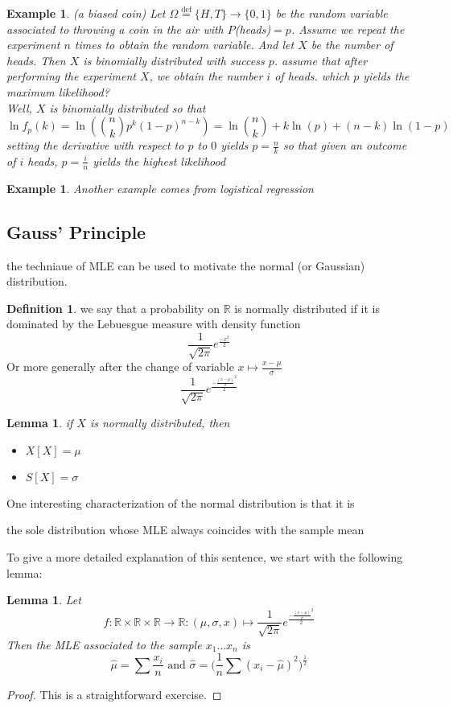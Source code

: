 \documentclass{book}
\theoremstyle{plain}
\newtheorem{example}[corollary]{Example}
\newtheorem{lemma}[corollary]{Lemma}
\theoremstyle{definition}
\newtheorem{definition}[corollary]{Definition}
\renewcommand{\d}[1]{\mathbb{#1}}
\newcommand{\define}{\stackrel{\operatorname{def}}{=}}
\newcommand{\fun}{\mapsto}
\newcommand{\mor}{\longrightarrow}
\begin{document}
\begin{example} (a biased coin)
Let $\Omega\define\{H,T\}\mor\{0,1\}$ be the random variable associated to throwing a coin in the air with $P$(heads)$=p$. Assume we repeat the experiment $n$ times to obtain the random variable. And let $X$ be the number of heads. Then $X$ is binomially distributed with success $p$. assume that after performing the experiment $X$, we obtain the number $i$ of heads. which $p$ yields the maximum likelihood?\\
Well, $X$ is binomially distributed so that
\[
\ln f_p(k)=\ln(\binom{n}{k}p^k(1-p)^{n-k})=\ln\binom{n}{k}+k\ln(p)+(n-k)\ln(1-p) 
\]
setting the derivative with respect to $p$ to $0$ yields $p=\frac{n}{k}$ so that given an outcome of $i$ heads, $p=\frac{i}{n}$ yields the highest likelihood
\end{example}

\begin{example}
Another example comes from logistical regression	
\end{example}

\subsection{Gauss' Principle} the techniaue of MLE can be used to motivate the normal (or Gaussian) distribution.
\begin{definition}
we say that a probability on $\d{R}$ is normally distributed if it is dominated by the Lebuesgue measure with density function
\[
\frac{1}{\sqrt{2\pi}}e^{\frac{-x^2}{2}}
\]
Or more generally after the change of variable $x\fun \frac{x-\mu}{\sigma}$
\[
\frac{1}{\sqrt{2\pi}}e^{\frac{-\frac{(x-\mu)}{\sigma}^2}{2}}
\]
\end{definition}
\begin{lemma}
if $X$ is normally distributed, then
\begin{itemize}
\item $X[X]=\mu$
\item $S[X]=\sigma$	
\end{itemize}

\end{lemma}

One interesting characterization of the normal distribution is that it is \begin{center}
the sole distribution whose MLE always coincides with the sample mean\end{center}
To give a more detailed explanation of this sentence, we start with the following lemma:
\begin{lemma}
Let
\[
f:\d{R}\times \d{R}\times \d{R}\mor \d{R}:(\mu,\sigma,x)\fun \frac{1}{\sqrt{2\pi}}e^{\frac{-\frac{(x-\mu)}{\sigma}^2}{2}}
\]	
Then the MLE associated to the sample $x_1\ldots x_n$ is
\[
\hat{\mu}=\sum \frac{x_i}{n}\textrm{ and }\hat{\sigma}=\big(\frac{1}{n}\sum(x_i-\hat{\mu})^2)^\frac{1}{2}
\]
\end{lemma}
\begin{proof}
This is a straightforward exercise.	
\end{proof}
\end{document}
